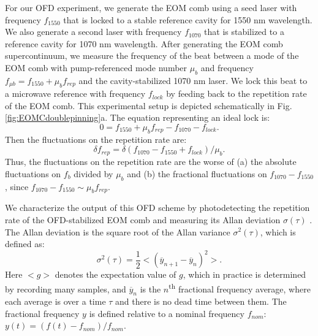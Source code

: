 For our OFD experiment, we generate the EOM comb using a seed laser with frequency $f_{1550}$ that is locked to a stable reference cavity for 1550 nm wavelength. We also generate a second laser with frequency $f_{1070}$ that is stabilized to a reference cavity for 1070 nm wavelength. After generating the EOM comb supercontinuum, we measure the frequency of the beat between a mode of the EOM comb with pump-referenced mode number $\mu_b$ and frequency $f_{\mu b}=f_{1550}+\mu_b f_{rep}$ and the cavity-stabilized 1070 nm laser. We lock this beat to a microwave reference with frequency $f_{lock}$ by feeding back to the repetition rate of the EOM comb. This experimental setup is depicted schematically in Fig. \ref{fig:EOMCdoublepinning}a. The equation representing an ideal lock is:
\begin{equation}
0=f_{1550}+\mu_b f_{rep}-f_{1070}-f_{lock}.
\end{equation}
Then the fluctuations on the repetition rate are:
\begin{equation}
\delta f_{rep}=\delta(f_{1070}-f_{1550}+f_{lock})/\mu_b.
\end{equation}
Thus, the fluctuations on the repetition rate are the worse of (a) the absolute fluctuations on $f_b$ divided by $\mu_b$ and (b) the fractional fluctuations on $f_{1070}-f_{1550}$, since $f_{1070}-f_{1550}\sim\mu_b f_{rep}$.

We characterize the output of this OFD scheme by photodetecting the repetition rate of the OFD-stabilized EOM comb and measuring its Allan deviation $\sigma(\tau)$ \cite{Levine1999}. The Allan deviation is the square root of the Allan variance $\sigma^2(\tau)$, which is defined as:
\begin{equation}
\sigma^2(\tau)=\frac{1}{2}<(\overline{y}_{n+1}-\overline{y}_n)^2>.
\end{equation}
Here $<g>$ denotes the expectation value of $g$, which in practice is determined by recording many samples, and $\overline{y}_n$ is the $n$\textsuperscript{th} fractional frequency average, where each average is over a time $\tau$ and there is no dead time between them. The fractional frequency $y$ is defined relative to a nominal frequency $f_{nom}$: $y(t)=(f(t)-f_{nom})/f_{nom}$.

